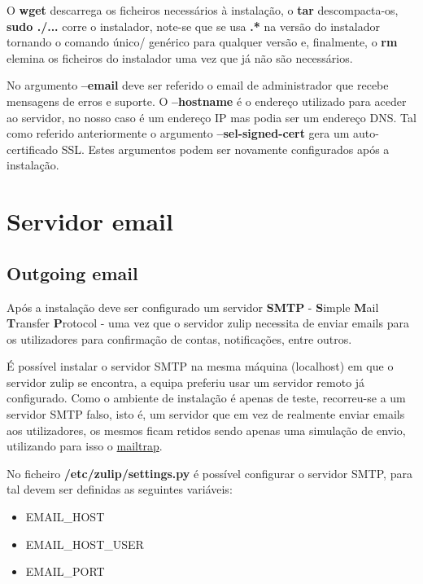 \documentclass[11pt,a4paper]{report}%
\begin{document}
O \textbf{wget} descarrega os ficheiros necessários à instalação, o \textbf{tar} descompacta-os, \textbf{sudo ./...} corre o instalador, note-se que se usa \textbf{.*} na versão do instalador tornando o comando único/ genérico para qualquer versão e, finalmente, o \textbf{rm} elemina os ficheiros do instalador uma vez que já não são necessários.

No argumento \textbf{--email} deve ser referido o email de administrador que recebe mensagens de erros e suporte. O \textbf{--hostname} é o endereço utilizado para aceder ao servidor, no nosso caso é um endereço IP mas podia ser um endereço DNS. Tal como referido anteriormente o argumento \textbf{--sel-signed-cert} gera um auto-certificado SSL. Estes argumentos podem ser novamente configurados após a instalação.


\newpage 
\section{Servidor email}

\subsection{Outgoing email}

Após a instalação deve ser configurado um servidor \textbf{SMTP} - \textbf{S}imple \textbf{M}ail \textbf{T}ransfer \textbf{P}rotocol - uma vez que o servidor zulip necessita de enviar emails para os utilizadores para confirmação de contas, notificações, entre outros. 

É possível instalar o servidor SMTP na mesma máquina (localhost) em que o servidor zulip se encontra, a equipa preferiu usar um servidor remoto já configurado. Como o ambiente de instalação é apenas de teste, recorreu-se a um servidor SMTP falso, isto é, um servidor que em vez de realmente enviar emails aos utilizadores, os mesmos ficam retidos sendo apenas uma simulação de envio, utilizando para isso o \href{https://mailtrap.io/}{mailtrap}.

No ficheiro \textbf{/etc/zulip/settings.py} é possível configurar o servidor SMTP, para tal devem ser definidas as seguintes variáveis:

\begin{itemize}
    \item EMAIL\_HOST
    \item EMAIL\_HOST\_USER
    \item EMAIL\_PORT
\end{itemize}
\end{document}

